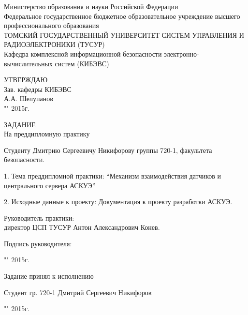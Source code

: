 \newpage
{}

\begin{center}
Министерство образования и науки Российской Федерации\\
Федеральное государственное бюджетное образовательное учреждение высшего профессионального образования\\
ТОМСКИЙ ГОСУДАРСТВЕННЫЙ УНИВЕРСИТЕТ СИСТЕМ УПРАВЛЕНИЯ И РАДИОЭЛЕКТРОНИКИ (ТУСУР)\\
Кафедра комплексной информационной безопасности электронно-вычислительных систем (КИБЭВС)\\
\end{center}

\begin{flushright}
 \begin{minipage}{0.4\textwidth}
  УТВЕРЖДАЮ \\
  Зав. кафедры КИБЭВС \\
  \underline{\hspace{2.5cm}}А.А. Шелупанов \\
  "\underline{\hspace{1cm}}"\underline{\hspace{3cm}} 2015г.
 \end{minipage}
\end{flushright}

\vspace{2cm}

\begin{center}
 ЗАДАНИЕ \\
 На преддипломную практику
\end{center}

Студенту Дмитрию Сергеевичу Никифорову группы 720-1, факультета безопасности.

1. Тема преддипломной практики: ``Механизм взаимодействия датчиков и центрального сервера АСКУЭ''

2. Исходные данные к проекту: Документация к проекту разработки АСКУЭ.

Руководитель практики: \\ директор ЦСП ТУСУР Антон Александрович Конев. 

\hfill Подпись руководителя: \underline{\hspace{2.5cm}}

\hfill "\underline{\hspace{1cm}}"\underline{\hspace{3cm}} 2015г.

Задание принял к исполнению

Студент гр. 720-1 Дмитрий Сергеевич Никифоров \hfill \underline{\hspace{2.5cm}}

\hfill "\underline{\hspace{1cm}}"\underline{\hspace{3cm}} 2015г.